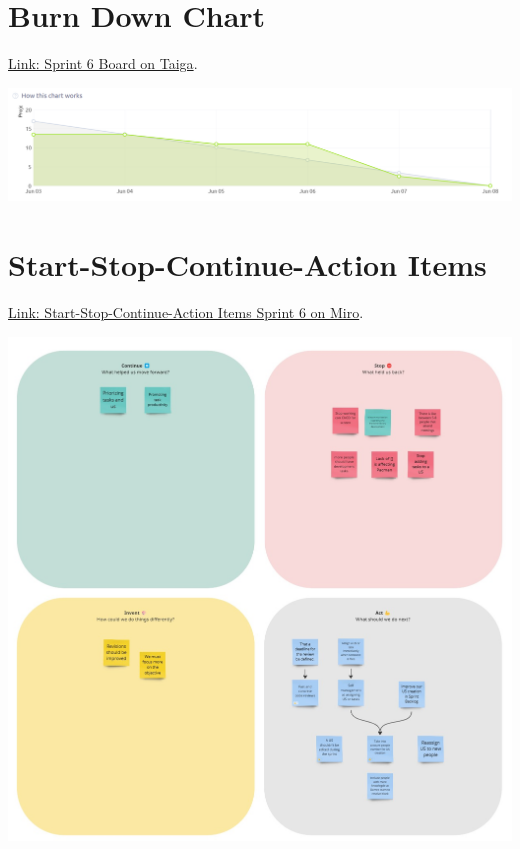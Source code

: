\documentclass{article}
\begin{document}
\hypertarget{burndownchart-s3}{
\section{Burn Down Chart}\label{Burn Down Chart S3}}
\href{https://tree.taiga.io/project/joseluis-teran-coffeetime/taskboard/sprint-6-3003}{Link: Sprint 6 Board on Taiga}.

\includegraphics[width=\textwidth]{./assets/Board-Sprint6.png}

\hypertarget{startstopcontinueactionitems-s3}{
\section{Start-Stop-Continue-Action Items}\label{Start-Stop-Continue-Action Items S6}}
\href{https://miro.com/app/board/uXjVKDO7l8M=/?moveToWidget=3458764591631763576&cot=14}{Link: Start-Stop-Continue-Action Items Sprint 6 on Miro}.

\includegraphics[width=\textwidth]{./assets/Retrospectives-6.png}
\end{document}
